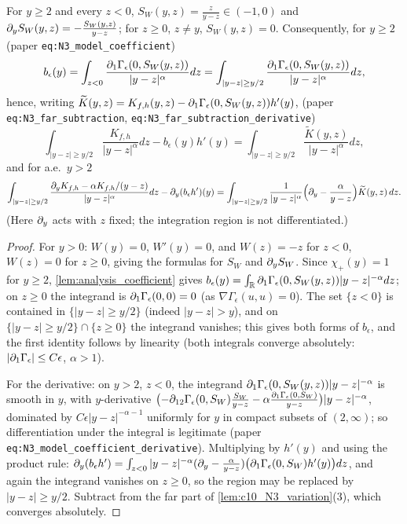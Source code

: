 \begin{lemma}
  \label{lem:c10_far_subtraction}
  For $y\ge2$ and every $z<0$, $S_W(y,z)=\frac{z}{y-z}\in(-1,0)$ and $\partial_yS_W(y,z)=-\frac{S_W(y,z)}{y-z}$;
  for $z\ge0$, $z\ne y$, $S_W(y,z)=0$. Consequently, for $y\ge2$ (paper \texttt{eq:N3\_model\_coefficient})
  \[
    b_\epsilon(y)=\int_{z<0}\frac{\partial_1\Gamma_\epsilon(0,S_W(y,z))}{|y-z|^\alpha}dz
    =\int_{|y-z|\ge y/2}\frac{\partial_1\Gamma_\epsilon(0,S_W(y,z))}{|y-z|^\alpha}dz,
  \]
  hence, writing $\widetilde K(y,z)=K_{f,h}(y,z)-\partial_1\Gamma_\epsilon(0,S_W(y,z))h'(y)$,
  (paper \texttt{eq:N3\_far\_subtraction}, \texttt{eq:N3\_far\_subtraction\_derivative})
  \[
    \int_{|y-z|\ge y/2}\frac{K_{f,h}}{|y-z|^\alpha}dz-b_\epsilon(y)h'(y)=\int_{|y-z|\ge y/2}\frac{\widetilde K(y,z)}{|y-z|^\alpha}dz,
  \]
  and for a.e.\ $y>2$
  \[
    \int_{|y-z|\ge y/2}\frac{\partial_yK_{f,h}-\alpha K_{f,h}/(y-z)}{|y-z|^\alpha}dz-\partial_y(b_\epsilon h')(y)
    =\int_{|y-z|\ge y/2}\frac{1}{|y-z|^\alpha}\Bigl(\partial_y-\frac{\alpha}{y-z}\Bigr)\widetilde K(y,z)\,dz .
  \]
  (Here $\partial_y$ acts with $z$ fixed; the integration region is not differentiated.)
\end{lemma}
\begin{proof}
  For $y>0$: $W(y)=0$, $W'(y)=0$, and $W(z)=-z$ for $z<0$, $W(z)=0$ for $z\ge0$, giving the formulas for
  $S_W$ and $\partial_yS_W$. Since $\chi_+(y)=1$ for $y\ge2$, \cref{lem:analysis_coefficient} gives
  $b_\epsilon(y)=\int_{\mathbb{R}}\partial_1\Gamma_\epsilon(0,S_W(y,z))|y-z|^{-\alpha}dz$; on $z\ge0$ the integrand is
  $\partial_1\Gamma_\epsilon(0,0)=0$ (as $\nabla\Gamma_\epsilon(u,u)=0$). The set $\{z<0\}$ is contained in
  $\{|y-z|\ge y/2\}$ (indeed $|y-z|>y$), and on $\{|y-z|\ge y/2\}\cap\{z\ge0\}$ the integrand vanishes; this
  gives both forms of $b_\epsilon$, and the first identity follows by linearity (both integrals converge
  absolutely: $|\partial_1\Gamma_\epsilon|\le C\epsilon$, $\alpha>1$).

  For the derivative: on $y>2$, $z<0$, the integrand $\partial_1\Gamma_\epsilon(0,S_W(y,z))|y-z|^{-\alpha}$ is smooth in $y$,
  with $y$-derivative $\bigl(-\partial_{12}\Gamma_\epsilon(0,S_W)\frac{S_W}{y-z}-\alpha\frac{\partial_1\Gamma_\epsilon(0,S_W)}{y-z}\bigr)|y-z|^{-\alpha}$,
  dominated by $C\epsilon|y-z|^{-\alpha-1}$ uniformly for $y$ in compact subsets of $(2,\infty)$; so
  differentiation under the integral is legitimate (paper \texttt{eq:N3\_model\_coefficient\_derivative}).
  Multiplying by $h'(y)$ and using the product rule:
  $\partial_y(b_\epsilon h')=\int_{z<0}|y-z|^{-\alpha}(\partial_y-\frac\alpha{y-z})\bigl(\partial_1\Gamma_\epsilon(0,S_W)h'(y)\bigr)dz$,
  and again the integrand vanishes on $z\ge0$, so the region may be replaced by $|y-z|\ge y/2$. Subtract
  from the far part of \cref{lem:c10_N3_variation}(3), which converges absolutely.
\end{proof}

